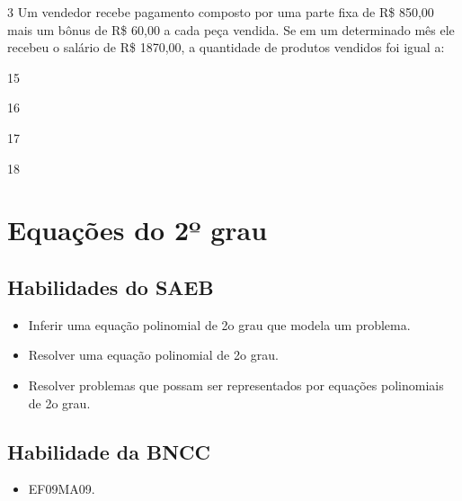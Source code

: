 \num{3} Um vendedor recebe pagamento composto por uma parte fixa de R\$
850,00 mais um bônus de R\$ 60,00 a cada peça vendida. Se em um
determinado mês ele recebeu o salário de R\$ 1870,00, a
quantidade de produtos vendidos foi igual a:

\begin{escolha}
  \item 15

  \item 16

  \item 17

  \item 18
\end{escolha}

\chapter{Equações do 2º grau}

\section*{Habilidades do SAEB}

\begin{itemize}
  \item Inferir uma equação polinomial de 2o grau que modela um problema.
  \item Resolver uma equação polinomial de 2o grau.
  \item Resolver problemas que possam ser representados por equações
polinomiais de 2o grau.   
\end{itemize} 

\section*{Habilidade da BNCC}

\begin{itemize}
  \item EF09MA09.
\end{itemize}

